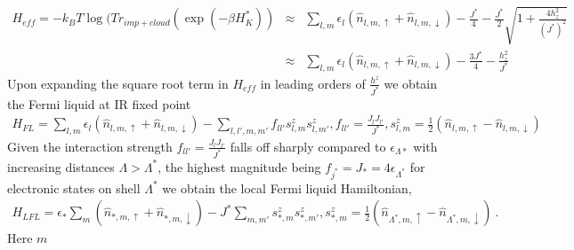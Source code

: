 \documentclass[aps,prl,preprint,groupedaddress]{revtex4-2}
\begin{document}
\begin{eqnarray}
H_{eff}=-k_{B}T\log(Tr_{imp+cloud}(\exp(-\beta H^{*}_{K})) &\approx &\sum_{l,m}\epsilon_{l}(\hat{n}_{l,m,\uparrow}+\hat{n}_{l,m,\downarrow})-\frac{J^{*}}{4}-\frac{J^{*}}{2}\sqrt{1+\frac{4h_{z}^{2}}{(J^{*})^{2}}}\nonumber\\
&\approx &\sum_{l,m}\epsilon_{l}(\hat{n}_{l,m,\uparrow}+\hat{n}_{l,m,\downarrow})-\frac{3J^{*}}{4}-\frac{h^{2}_{z}}{J^{*}}
\end{eqnarray}
Upon expanding the square root term in $H_{eff}$ in leading orders of $\frac{h^{z}}{J^{*}}$ we obtain the Fermi liquid at IR fixed point
\begin{eqnarray}
H_{FL}=\sum_{l,m}\epsilon_{l}(\hat{n}_{l,m,\uparrow}+\hat{n}_{l,m,\downarrow})-\sum_{l,l',m,m'}f_{ll'}s^{z}_{l,m}s^{z}_{l,m'}, f_{ll'}=\frac{J_{l}J_{l'}}{J^{*}}, s^{z}_{l,m}=\frac{1}{2}(\hat{n}_{l,m,\uparrow}-\hat{n}_{l,m,\downarrow})
\end{eqnarray}
Given the interaction strength $f_{ll'}=\frac{J_{l}J_{l'}}{J^{*}}$ falls off sharply compared to $\epsilon_{\Lambda*}$ with increasing distances $\Lambda>\Lambda^{*}$, the highest magnitude being $f_{j^{*}}=J_{*}=4\epsilon_{\Lambda^{*}}$ for electronic states on shell $\Lambda^{*}$ we obtain the local Fermi liquid Hamiltonian,
\begin{eqnarray}
H_{LFL}=\epsilon_{*}\sum_{m}(\hat{n}_{*,m,\uparrow}+\hat{n}_{*,m,\downarrow})-J^{*}\sum_{m,m'}s^{z}_{*,m}s^{z}_{*,m'}, s^{z}_{*,m}=\frac{1}{2}(\hat{n}_{\Lambda^{*},m,\uparrow}-\hat{n}_{\Lambda^{*},m,\downarrow})~.
\end{eqnarray}
Here $m$ 
\end{document}
